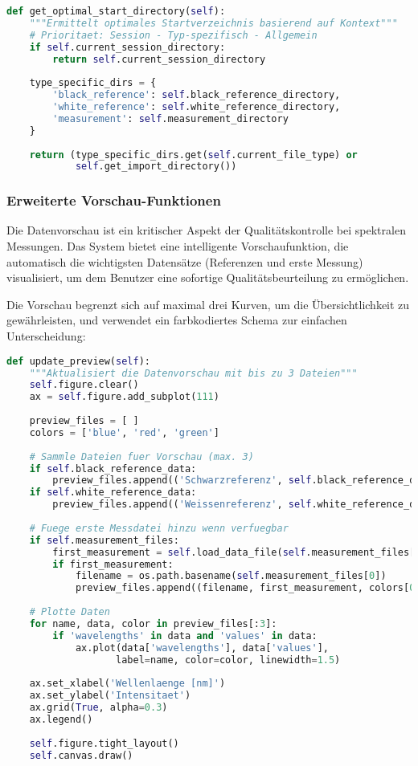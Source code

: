 \begin{lstlisting}[language=Python, caption=Intelligente Verzeichnisverwaltung]
def get_optimal_start_directory(self):
    """Ermittelt optimales Startverzeichnis basierend auf Kontext"""
    # Prioritaet: Session - Typ-spezifisch - Allgemein
    if self.current_session_directory:
        return self.current_session_directory
    
    type_specific_dirs = {
        'black_reference': self.black_reference_directory,
        'white_reference': self.white_reference_directory,
        'measurement': self.measurement_directory
    }
    
    return (type_specific_dirs.get(self.current_file_type) or 
            self.get_import_directory())
\end{lstlisting}

\subsubsection{Erweiterte Vorschau-Funktionen}

Die Datenvorschau ist ein kritischer Aspekt der Qualitätskontrolle bei spektralen Messungen. Das System bietet eine intelligente Vorschaufunktion, die automatisch die wichtigsten Datensätze (Referenzen und erste Messung) visualisiert, um dem Benutzer eine sofortige Qualitätsbeurteilung zu ermöglichen.

Die Vorschau begrenzt sich auf maximal drei Kurven, um die Übersichtlichkeit zu gewährleisten, und verwendet ein farbkodiertes Schema zur einfachen Unterscheidung:

\begin{lstlisting}[language=Python, caption=Intelligente Datenvorschau]
def update_preview(self):
    """Aktualisiert die Datenvorschau mit bis zu 3 Dateien"""
    self.figure.clear()
    ax = self.figure.add_subplot(111)
    
    preview_files = [ ]
    colors = ['blue', 'red', 'green']
    
    # Sammle Dateien fuer Vorschau (max. 3)
    if self.black_reference_data:
        preview_files.append(('Schwarzreferenz', self.black_reference_data, 'black'))
    if self.white_reference_data:
        preview_files.append(('Weissenreferenz', self.white_reference_data, 'gray'))
    
    # Fuege erste Messdatei hinzu wenn verfuegbar
    if self.measurement_files:
        first_measurement = self.load_data_file(self.measurement_files[0])
        if first_measurement:
            filename = os.path.basename(self.measurement_files[0])
            preview_files.append((filename, first_measurement, colors[0]))
    
    # Plotte Daten
    for name, data, color in preview_files[:3]:
        if 'wavelengths' in data and 'values' in data:
            ax.plot(data['wavelengths'], data['values'], 
                   label=name, color=color, linewidth=1.5)
    
    ax.set_xlabel('Wellenlaenge [nm]')
    ax.set_ylabel('Intensitaet')
    ax.grid(True, alpha=0.3)
    ax.legend()
    
    self.figure.tight_layout()
    self.canvas.draw()
\end{lstlisting}

